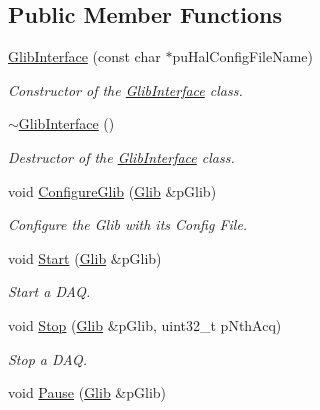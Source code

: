 \subsection*{Public Member Functions}
\begin{DoxyCompactItemize}
\item 
\hyperlink{class_ph2___hw_interface_1_1_glib_interface_a4aebde48748debad7e261c654c2c6fd8}{Glib\-Interface} (const char $\ast$pu\-Hal\-Config\-File\-Name)
\begin{DoxyCompactList}\small\item\em Constructor of the \hyperlink{class_ph2___hw_interface_1_1_glib_interface}{Glib\-Interface} class. \end{DoxyCompactList}\item 
\hyperlink{class_ph2___hw_interface_1_1_glib_interface_a1182c81cb29bca33b23a2c9f662df2ed}{$\sim$\-Glib\-Interface} ()
\begin{DoxyCompactList}\small\item\em Destructor of the \hyperlink{class_ph2___hw_interface_1_1_glib_interface}{Glib\-Interface} class. \end{DoxyCompactList}\item 
void \hyperlink{class_ph2___hw_interface_1_1_glib_interface_aad68569190ea9b318b5be1abae4fd23f}{Configure\-Glib} (\hyperlink{class_ph2___hw_description_1_1_glib}{Glib} \&p\-Glib)
\begin{DoxyCompactList}\small\item\em Configure the Glib with its Config File. \end{DoxyCompactList}\item 
void \hyperlink{class_ph2___hw_interface_1_1_glib_interface_a0706eb396293fe5c8c717c5d0ab82165}{Start} (\hyperlink{class_ph2___hw_description_1_1_glib}{Glib} \&p\-Glib)
\begin{DoxyCompactList}\small\item\em Start a D\-A\-Q. \end{DoxyCompactList}\item 
void \hyperlink{class_ph2___hw_interface_1_1_glib_interface_a3073d292371ab4e602900f4276a43b6c}{Stop} (\hyperlink{class_ph2___hw_description_1_1_glib}{Glib} \&p\-Glib, uint32\-\_\-t p\-Nth\-Acq)
\begin{DoxyCompactList}\small\item\em Stop a D\-A\-Q. \end{DoxyCompactList}\item 
void \hyperlink{class_ph2___hw_interface_1_1_glib_interface_a1db7815b60c3e3637b23bfa27bab9692}{Pause} (\hyperlink{class_ph2___hw_description_1_1_glib}{Glib} \&p\-Glib)

\end{DoxyCompactItemize}

